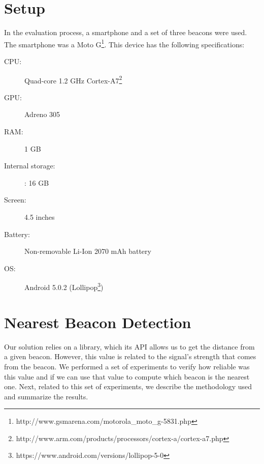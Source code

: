 \section{Setup}
\label{sec:evaluation_setup}
In the evaluation process, a smartphone and a set of three beacons were used.
The smartphone was a 
Moto G\footnote{http://www.gsmarena.com/motorola\_moto\_g-5831.php}.
This device has the following specifications:
\begin{description}
  \item[\gls{CPU}:] Quad-core 1.2 GHz Cortex-A7\footnote{http://www.arm.com/products/processors/cortex-a/cortex-a7.php}
  \item[\gls{GPU}:] Adreno 305
  \item[\gls{RAM}:] 1 \gls{GB}
  \item[Internal storage:]: 16 \gls{GB}
  \item[Screen:] 4.5 inches
  \item[Battery:] Non-removable Li-Ion 2070 \gls{mAh} battery
  \item[\gls{OS}:] Android 5.0.2 (Lollipop\footnote{https://www.android.com/versions/lollipop-5-0})
\end{description}

\section{Nearest Beacon Detection}
\label{sec:evaluation_nearest_beacon}
Our solution relies on a library, which its \gls{API} allows us to get the distance from a given beacon.
However, this value is related to the signal's strength that comes from the beacon.
We performed a set of experiments to verify how reliable was this value and if we can use that value to compute which beacon is the nearest one.
Next, related to this set of experiments, we describe the methodology used and summarize the results.

